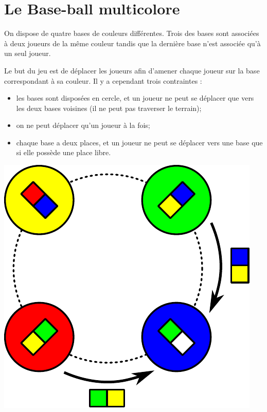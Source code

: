 \chapter*{Le Base-ball multicolore}

On dispose de quatre bases de couleurs différentes. Trois des bases sont
associées à deux joueurs de la même couleur tandis que la dernière base n'est
associée qu'à un seul joueur. 

Le but du jeu est de déplacer les joueurs afin d'amener chaque joueur sur la
base correspondant à sa couleur. Il y a cependant trois contraintes :

\begin{itemize}
\item les bases sont disposées en cercle, et un joueur ne peut se déplacer que
  vers les deux bases voisines (il ne peut pas traverser le terrain);
\item on ne peut déplacer qu'un joueur à la fois;
\item chaque base a deux places, et un joueur ne peut se déplacer vers une base
  que si elle possède une place libre.
\end{itemize}

\begin{center}
  \includegraphics[width=0.3\linewidth]{img/baseball_coup.pdf}
\end{center}


